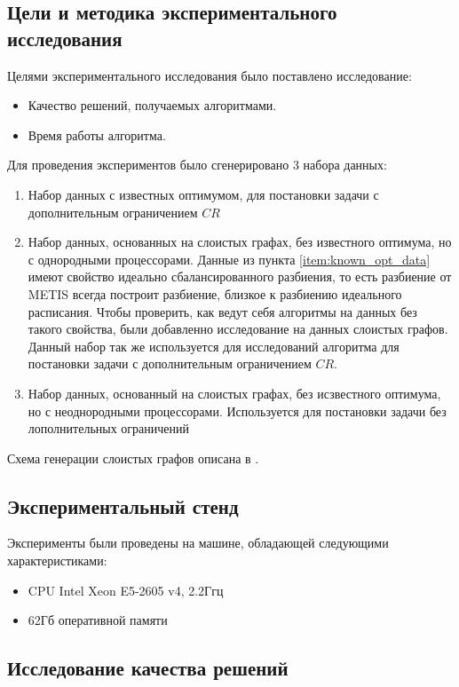 \subsection{Цели и методика экспериментального исследования}
Целями экспериментального исследования было поставлено исследование:
\begin{itemize}
    \item Качество решений, получаемых алгоритмами.
    \item Время работы алгоритма.
\end{itemize}

Для проведения экспериментов было сгенерировано 3 набора данных:
\begin{enumerate}
    \item \label{item:known_opt_data} Набор данных с известных оптимумом, для постановки задачи с дополнительным ограничением $CR$
    \item Набор данных, основанных на слоистых графах, без известного оптимума, но с однородными процессорами. Данные из пункта \ref{item:known_opt_data} имеют свойство идеально сбалансированного разбиения, то есть разбиение от METIS всегда построит разбиение, близкое к разбиению идеального расписания. Чтобы проверить, как ведут себя алгоритмы на данных без такого свойства, были добавленно исследование на данных слоистых графов. Данный набор так же используется для исследований алгоритма для постановки задачи с дополнительным ограничением $CR$.
    \item Набор данных, основанный на слоистых графах, без исзвестного оптимума, но с неоднородными процессорами. Используется для постановки задачи без лополнительных ограничений
\end{enumerate}

Схема генерации слоистых графов описана в \cite{Canon_2019}.

\subsection{Экспериментальный стенд}

Эксперименты были проведены на машине, обладающей следующими характеристиками:
\begin{itemize}
    \item CPU Intel Xeon E5-2605 v4, 2.2Ггц
    \item 62Гб оперативной памяти
\end{itemize}

\subsection{Исследование качества решений}

